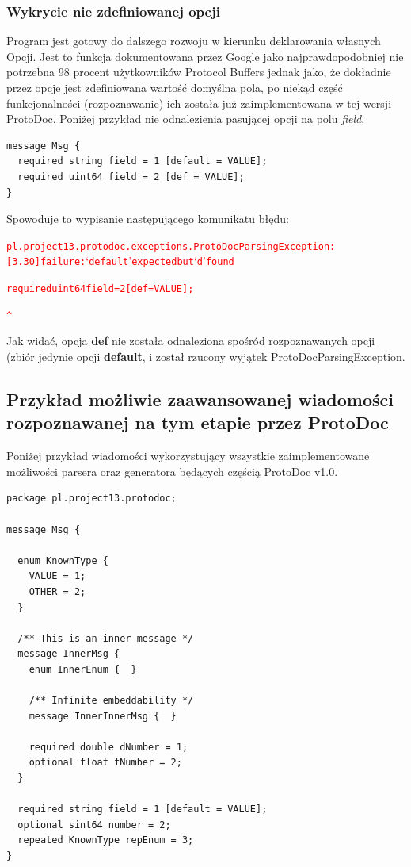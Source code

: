 \documentclass[a4paper]{article}
\begin{document}
\subsubsection{Wykrycie nie zdefiniowanej opcji}
Program jest gotowy do dalszego rozwoju w kierunku deklarowania własnych Opcji. Jest to funkcja dokumentowana przez Google jako 
najprawdopodobniej nie potrzebna 98 procent użytkowników Protocol Buffers jednak jako, że dokładnie przez opcje jest zdefiniowana wartość domyślna pola,
po niekąd część funkcjonalności (rozpoznawanie) ich została już zaimplementowana w tej wersji ProtoDoc. Poniżej przykład nie odnalezienia pasującej opcji na polu \textit{field}.

\begin{verbatim}
message Msg {
  required string field = 1 [default = VALUE];
  required uint64 field = 2 [def = VALUE];
} 
\end{verbatim}
Spowoduje to wypisanie następującego komunikatu błędu:

\begin{alltt}
\textcolor{Red}{pl.project13.protodoc.exceptions.ProtoDocParsingException: 
[3.30] failure: `default' expected but `d' found

  required uint64 field = 2 [def = VALUE];

                             ^}\end{alltt}

Jak widać, opcja \textbf{def} nie została odnaleziona spośród rozpoznawanych opcji (zbiór jedynie opcji \textbf{default},
i został rzucony wyjątek ProtoDocParsingException.

\newpage
\subsection{Przykład możliwie zaawansowanej wiadomości rozpoznawanej na tym etapie przez ProtoDoc}
Poniżej przykład wiadomości wykorzystujący wszystkie zaimplementowane możliwości parsera oraz generatora będących częścią ProtoDoc v1.0.

\begin{verbatim}
package pl.project13.protodoc;

message Msg {

  enum KnownType {
    VALUE = 1;
    OTHER = 2;
  }
  
  /** This is an inner message */
  message InnerMsg {
    enum InnerEnum {  }

    /** Infinite embeddability */
    message InnerInnerMsg {  }

    required double dNumber = 1;    
    optional float fNumber = 2;    
  }

  required string field = 1 [default = VALUE];
  optional sint64 number = 2;
  repeated KnownType repEnum = 3;
} 
\end{verbatim}
\end{document}
